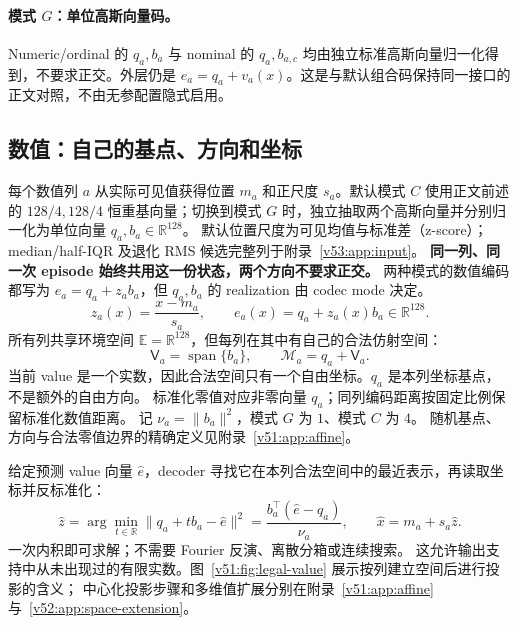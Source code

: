 \documentclass[11pt,UTF8,fontset=fandol]{ctexart}
\numberwithin{equation}{section}
\theoremstyle{definition}
\newcommand{\R}{\mathbb R}
\begin{document}
\paragraph{模式 $G$：单位高斯向量码。}
Numeric/ordinal 的 $q_a,b_a$ 与 nominal 的 $q_a,b_{a,c}$
均由独立标准高斯向量归一化得到，不要求正交。外层仍是 $e_a=q_a+v_a(x)$。这是与默认组合码保持同一接口的正文对照，不由无参配置隐式启用。

\subsection{数值：自己的基点、方向和坐标}
\label{v51:sec:affine-main}\label{v52:sec:feature-spaces}
每个数值列 $a$ 从实际可见值获得位置 $m_a$ 和正尺度 $s_a$。默认模式 $C$ 使用正文前述的 $128/4,128/4$ 恒重基向量；切换到模式 $G$ 时，独立抽取两个高斯向量并分别归一化为单位向量 $q_a,b_a\in\R^{128}$。
默认位置尺度为可见均值与标准差（z-score）；median/half-IQR 及退化 RMS 候选完整列于附录~\ref{v53:app:input}。
\textbf{同一列、同一次 episode 始终共用这一份状态，两个方向不要求正交。}
两种模式的数值编码都写为 $e_a=q_a+z_a b_a$，但 $q_a,b_a$ 的 realization 由 codec mode 决定。
\begin{equation}
 \boxed{z_a(x)=\frac{x-m_a}{s_a},\qquad
 e_a(x)=q_a+z_a(x)b_a\in\R^{128}.}
 \label{v51:eq:affine-code}
\end{equation}
所有列共享环境空间 $\mathbb E=\R^{128}$，但每列在其中有自己的合法仿射空间：
\begin{equation}
 \mathsf V_a=\operatorname{span}\{b_a\},\qquad
 \boxed{\mathcal M_a=q_a+\mathsf V_a.}
 \label{v52:eq:feature-space}
\end{equation}
当前 value 是一个实数，因此合法空间只有一个自由坐标。$q_a$ 是本列坐标基点，不是额外的自由方向。
标准化零值对应非零向量 $q_a$；同列编码距离按固定比例保留标准化数值距离。
记 $\nu_a=\|b_a\|^2$，模式 $G$ 为 $1$、模式 $C$ 为 $4$。
随机基点、方向与合法零值边界的精确定义见附录~\ref{v51:app:affine}。

给定预测 value 向量 $\widehat e$，decoder 寻找它在本列合法空间中的最近表示，再读取坐标并反标准化：
\begin{equation}
 \boxed{\widehat z=\arg\min_{t\in\R}\|q_a+t b_a-\widehat e\|^2
       =\frac{b_a^\top(\widehat e-q_a)}{\nu_a},\qquad
        \widehat x=m_a+s_a\widehat z.}
 \label{v51:eq:affine-decode}
\end{equation}
一次内积即可求解；不需要 Fourier 反演、离散分箱或连续搜索。
这允许输出支持中从未出现过的有限实数。图~\ref{v51:fig:legal-value} 展示按列建立空间后进行投影的含义；
中心化投影步骤和多维值扩展分别在附录~\ref{v51:app:affine} 与~\ref{v52:app:space-extension}。
\end{document}
